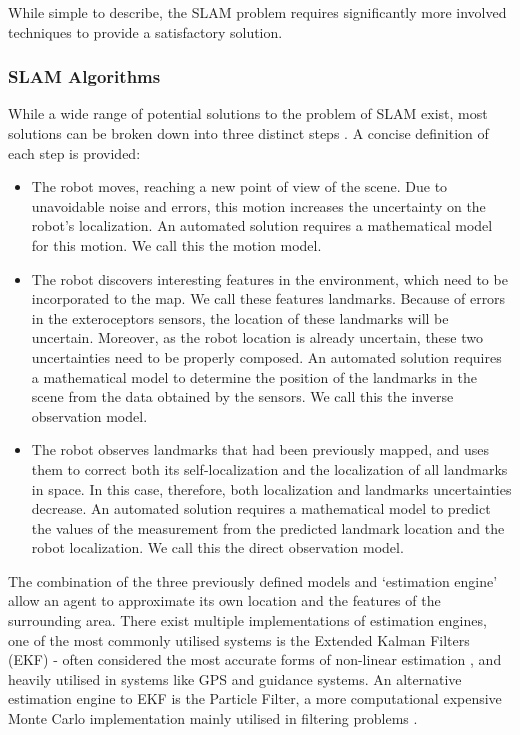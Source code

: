 While simple to describe, the SLAM problem requires significantly more
involved techniques to provide a satisfactory solution.

\subsubsection{SLAM Algorithms}
While a wide range of potential solutions to the problem of SLAM exist, most
solutions can be broken down into three distinct steps \cite{Sola2013}. 
A concise definition of each step is provided:

\begin{itemize}
\item The robot moves, reaching a new point of view of the scene. 
Due to unavoidable noise and errors, this motion increases the uncertainty on
the robot’s localization.
An automated solution requires a mathematical model for this motion. We call
this the motion model.

\item The robot discovers interesting features in the environment, which need
to be incorporated to the map. 
We call these features landmarks. 
Because of errors in the exteroceptors sensors, the location of these
landmarks will be uncertain.
Moreover, as the robot location is already uncertain, these two uncertainties
need to be properly composed. 
An automated solution requires a mathematical model to determine the position
of the landmarks in the scene from the data obtained by the sensors. 
We call this the inverse observation model.

\item The robot observes landmarks that had been previously mapped, and uses
them to correct both its self-localization and the localization of all
landmarks in space.
In this case, therefore, both localization and landmarks uncertainties
decrease.  
An automated solution requires a mathematical model to predict the
values of the measurement from the predicted landmark location and the robot
localization. 
We call this the direct observation model.
\end{itemize}

The combination of the three previously defined models and `estimation engine'
\cite{Sola2013} allow an agent to approximate its own location and the features
of the surrounding  area.
There exist multiple implementations of estimation engines, one of the most
commonly utilised systems is the Extended Kalman Filters (EKF) \cite{4378854}
- often considered the most accurate forms of non-linear estimation
  \cite{1271397}, and heavily utilised in systems like GPS and guidance
  systems.
An alternative estimation engine to EKF is the Particle Filter, a more
computational expensive Monte Carlo implementation mainly utilised in
filtering problems \cite{Bugallo2007}.

